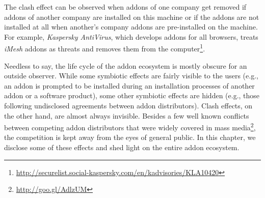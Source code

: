 \documentclass[ijoc,nonblindrev]{informs3} %
\numberwithin{equation}{subsection}
\begin{document}
The clash effect can be observed when addons of one company get removed if addons of another company are installed on this machine or if the addons are not installed at all when another's company addons are pre-installed on the machine. For example, \emph{Kaspersky AntiVirus}, which develops addons for all browsers, treats \emph{iMesh} addons as threats and removes them from the computer\footnote{\url{http://securelist.social-kaspersky.com/en/kadvisories/KLA10420}}.

Needless to say, the life cycle of the addon ecosystem is mostly obscure for an outside observer. While some symbiotic effects are fairly visible to the users (e.g., an addon is prompted to be installed during an installation processes of another addon or a software product), some other symbiotic effects are hidden (e.g., those following undisclosed agreements between addon distributors). Clash effects, on the other hand, are almost always invisible. Besides a few well known conflicts between competing addon distributors that were widely covered in mass media\footnote{\url{http://goo.gl/AdlzUM}}, the competition is kept away from the eyes of general public. In this chapter, we disclose some of these effects and shed light on the entire addon ecosystem. 

\end{document}
